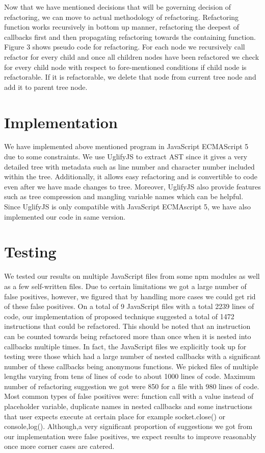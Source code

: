 \documentclass[10pt,conference]{IEEEtran}
\begin{document}
Now that we have mentioned decisions that will be governing decision of refactoring, we can move to actual methodology of refactoring. Refactoring function works recursively in bottom up manner, refactoring the deepest of callbacks first and then propagating refactoring towards the containing function. Figure 3 shows pseudo code for refactoring. For each node we recursively call refactor for every child and once all children nodes have been refactored we check for every child node with respect to fore-mentioned conditions if child node is refactorable. If it is refactorable, we delete that node from current tree node and add it to parent tree node.
\section{Implementation}
We have implemented above mentioned program in JavaScript ECMAScript 5 due to some constraints. We use UglifyJS to extract AST since it gives a very detailed tree with metadata such as line number and character number included within the tree. Additionally, it allows easy refactoring and is convertible to code even after we have made changes to tree. Moreover, UglifyJS also provide features such as tree compression and mangling variable names which can be helpful. Since UglifyJS is only compatible with JavaScript ECMAscript 5, we have also implemented our code in same version.

\section{Testing}
We tested our results on multiple JavaScript files from some npm modules as well as a few self-written files. Due to certain limitations we got a large number of false positives, however, we figured that by handling more cases we could get rid of these false positives. On a total of 9 JavaScript files with a total 2239 lines of code, our implementation of proposed technique suggested a total of 1472 instructions that could be refactored. This should be noted that an instruction can be counted towards being refactored more than once when it is nested into callbacks multiple times. In fact, the JavaScript files we explicitly took up for testing were those which had a large number of nested callbacks with a significant number of these callbacks being anonymous functions. We picked files of multiple lengths varying from tens of lines of code to about 1000 lines of code. Maximum number of refactoring suggestion we got were 850 for a file with 980 lines of code. Most common types of false positives were:  function call with a value instead of placeholder variable, duplicate names in nested callbacks and some instructions that user expects execute at certain place for example socket.close() or console,log(). Although,a very significant proportion of suggestions we got from our implementation were false positives, we expect results to improve reasonably once more corner cases are catered.
\end{document}
